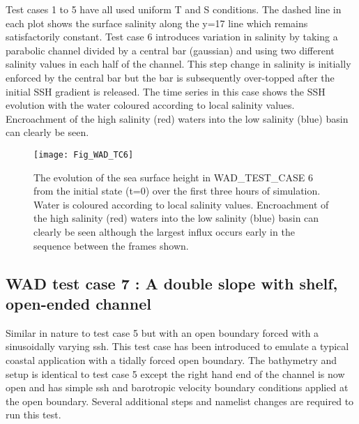 Test cases 1 to 5 have all used uniform T and S conditions. The dashed line in each plot
shows the surface salinity along the y=17 line which remains satisfactorily constant. Test
case 6 introduces variation in salinity by taking a parabolic channel divided by a central
bar (gaussian) and using two different salinity values in each half of the channel. This
step change in salinity is initially enforced by the central bar but the bar is
subsequently over-topped after the initial SSH gradient is released. The time series in
this case shows the SSH evolution with the water coloured according to local salinity
values. Encroachment of the high salinity (red) waters into the low salinity (blue) basin
can clearly be seen.


\begin{figure}[htb] \begin{center}
\texttt{[image: Fig\_WAD\_TC6]}
\caption{ \label{Fig_WAD_TC6}
The evolution of the sea surface height in WAD\_TEST\_CASE 6 from the initial state (t=0)
over the first three hours of simulation. Water is coloured according to local salinity
values. Encroachment of the high salinity (red) waters into the low salinity (blue) basin
can clearly be seen although the largest influx occurs early in the sequence between the
frames shown.}
\end{center}\end{figure}

\clearpage
\subsection [WAD test case 7 : A double slope with shelf, open-ended channel ]
                    {WAD test case 7 : A double slope with shelf, open-ended channel}
\label{WAD_test_case7}

Similar in nature to test case 5 but with an open boundary forced with a sinusoidally
varying ssh. This test case has been introduced to emulate a typical coastal application
with a tidally forced open boundary. The bathymetry and setup is identical to test case 5
except the right hand end of the channel is now open and has simple ssh and barotropic
velocity boundary conditions applied at the open boundary. Several additional steps and
namelist changes are required to run this test.


